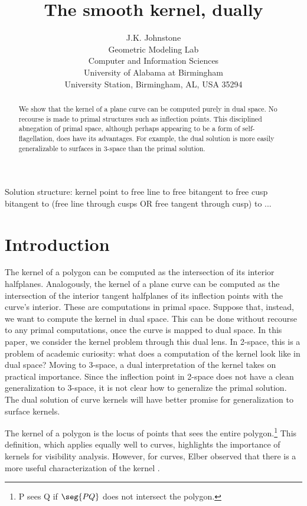 \documentclass[12pt]{article}
\title{The smooth kernel, dually}
\author{J.K. Johnstone\\
	Geometric Modeling Lab\\
	Computer and Information Sciences\\
	University of Alabama at Birmingham\\
	University Station, Birmingham, AL, USA 35294}
\begin{document}
\maketitle

\begin{abstract}
We show that the kernel of a plane curve can be computed purely in dual space.
No recourse is made to primal structures such as inflection points.
This disciplined abnegation of primal space, although perhaps appearing
to be a form of self-flagellation, does have its advantages.
For example, the dual solution is more easily generalizable to 
surfaces in 3-space than the primal solution.
\end{abstract}

Solution structure: kernel point to free line to free bitangent to 
			free cusp bitangent to (free line through cusps
			OR free tangent through cusp) to ...

\section{Introduction}

The kernel of a polygon can be computed as the intersection of its interior
halfplanes.
Analogously, the kernel of a plane curve can be computed as the intersection
of the interior tangent halfplanes of its inflection points
with the curve's interior.
These are computations in primal space.
Suppose that, instead, we want to compute the kernel in dual space.
This can be done without recourse to any primal computations,
once the curve %
is mapped to dual space.
In this paper, we consider the kernel problem through this dual lens.
In 2-space, this is a problem of academic curiosity: what does a
computation of the kernel look like in dual space?
Moving to 3-space, a dual interpretation of the kernel 
takes on practical importance.
Since the inflection point in 2-space does not have a clean generalization
to 3-space, it is not clear how to generalize the primal solution.
The dual solution of curve kernels will have better promise for generalization
to surface kernels.

The kernel of a polygon is the locus of points that sees the entire 
polygon.\footnote{P sees Q if $\seg{PQ}$ does not intersect the polygon.}
This definition, which applies equally well to curves,
highlights the importance of kernels for visibility analysis.
However, for curves, Elber observed that there is a more useful 
characterization of the kernel \cite{elber02}.
\end{document}
